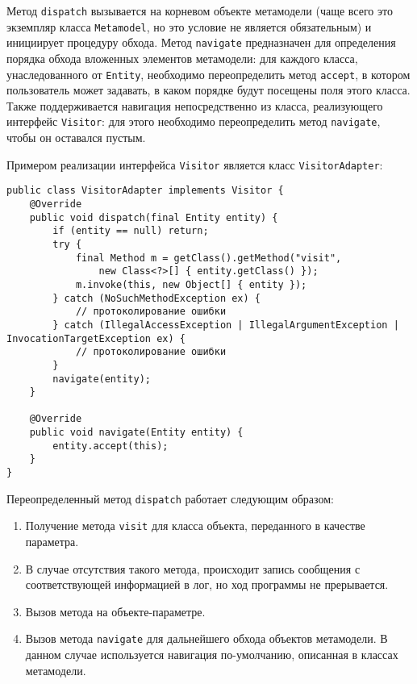 Метод \texttt{dispatch} вызывается на корневом объекте метамодели (чаще всего
это экземпляр класса \texttt{Metamodel}, но это условие не является
обязательным) и инициирует процедуру обхода. Метод \texttt{navigate}
предназначен для определения порядка обхода вложенных элементов метамодели: для
каждого класса, унаследованного от \texttt{Entity}, необходимо переопределить
метод \texttt{accept}, в котором пользователь может задавать, в каком порядке
будут посещены поля этого класса. Также поддерживается навигация
непосредственно из класса, реализующего интерфейс \texttt{Visitor}: для этого
необходимо переопределить метод \texttt{navigate}, чтобы он оставался пустым.

Примером реализации интерфейса \texttt{Visitor} является класс
\texttt{VisitorAdapter}:

\begin{lstlisting}[caption={Реализация интерфейса Visitor}]
public class VisitorAdapter implements Visitor {
    @Override
    public void dispatch(final Entity entity) {
        if (entity == null) return;
        try {
            final Method m = getClass().getMethod("visit",
                new Class<?>[] { entity.getClass() });
            m.invoke(this, new Object[] { entity });
        } catch (NoSuchMethodException ex) {
            // протоколирование ошибки
        } catch (IllegalAccessException | IllegalArgumentException | InvocationTargetException ex) {
            // протоколирование ошибки
        }
        navigate(entity);
    }

    @Override
    public void navigate(Entity entity) {
        entity.accept(this);
    }
}
\end{lstlisting}

Переопределенный метод \texttt{dispatch} работает следующим образом:

\begin{enumerate}
    \item Получение метода \texttt{visit} для класса объекта, переданного
    в качестве параметра.
    \item В случае отсутствия такого метода, происходит запись сообщения с
    соответствующей информацией в лог, но ход программы не прерывается.
    \item Вызов метода на объекте-параметре.
    \item Вызов метода \texttt{navigate} для дальнейшего обхода объектов
    метамодели. В данном случае используется навигация по-умолчанию, описанная
    в классах метамодели.
\end{enumerate}

